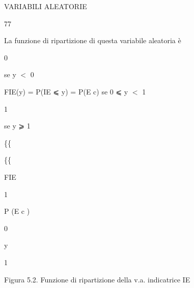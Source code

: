 \documentclass[a4paper,portrait,12pt]{article}
\begin{document}
\begin{flushleft}
\newpage
VARIABILI ALEATORIE
\end{flushleft}





77





\begin{flushleft}
La funzione di ripartizione di questa variabile aleatoria \`{e}
\end{flushleft}


0


\begin{flushleft}
se y $<$ 0
\end{flushleft}


\begin{flushleft}
FIE(y) = P(IE ⩽ y) = P(E c) se 0 ⩽ y $<$ 1
\end{flushleft}


1


\begin{flushleft}
se y ⩾ 1
\end{flushleft}





\{\{


\{\{





\begin{flushleft}
FIE
\end{flushleft}


1


\begin{flushleft}
P (E c )
\end{flushleft}


0





\begin{flushleft}
y
\end{flushleft}





1





\begin{flushleft}
Figura 5.2. Funzione di ripartizione della v.a. indicatrice IE
\end{flushleft}
\end{document}
